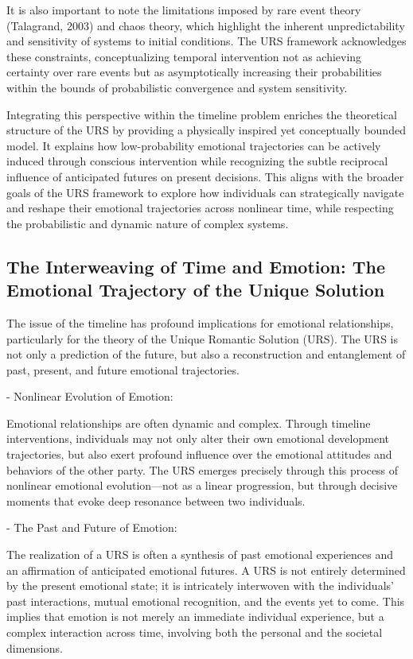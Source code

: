 \documentclass{article}
\begin{document}
It is also important to note the limitations imposed by rare event theory (Talagrand, 2003) and chaos theory, which highlight the inherent unpredictability and sensitivity of systems to initial conditions. The URS framework acknowledges these constraints, conceptualizing temporal intervention not as achieving certainty over rare events but as asymptotically increasing their probabilities within the bounds of probabilistic convergence and system sensitivity.

Integrating this perspective within the timeline problem enriches the theoretical structure of the URS by providing a physically inspired yet conceptually bounded model. It explains how low-probability emotional trajectories can be actively induced through conscious intervention while recognizing the subtle reciprocal influence of anticipated futures on present decisions. This aligns with the broader goals of the URS framework to explore how individuals can strategically navigate and reshape their emotional trajectories across nonlinear time, while respecting the probabilistic and dynamic nature of complex systems.

\subsection{The Interweaving of Time and Emotion: The Emotional Trajectory of the Unique Solution}

The issue of the timeline has profound implications for emotional relationships, particularly for the theory of the Unique Romantic Solution (URS). The URS is not only a prediction of the future, but also a reconstruction and entanglement of past, present, and future emotional trajectories.

- Nonlinear Evolution of Emotion:

Emotional relationships are often dynamic and complex. Through timeline interventions, individuals may not only alter their own emotional development trajectories, but also exert profound influence over the emotional attitudes and behaviors of the other party. The URS emerges precisely through this process of nonlinear emotional evolution—not as a linear progression, but through decisive moments that evoke deep resonance between two individuals.

- The Past and Future of Emotion:

The realization of a URS is often a synthesis of past emotional experiences and an affirmation of anticipated emotional futures. A URS is not entirely determined by the present emotional state; it is intricately interwoven with the individuals' past interactions, mutual emotional recognition, and the events yet to come. This implies that emotion is not merely an immediate individual experience, but a complex interaction across time, involving both the personal and the societal dimensions.
\end{document}
